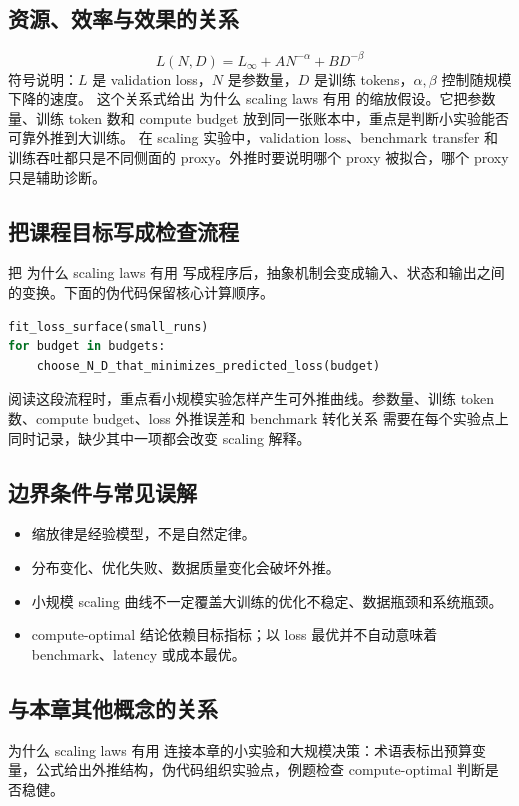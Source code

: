 \documentclass[a4paper]{article}
\begin{document}
\subsection{资源、效率与效果的关系}
\[L(N,D)=L_\infty + A N^{-\alpha}+B D^{-\beta}\]
符号说明：\(L\) 是 validation loss，\(N\) 是参数量，\(D\) 是训练 tokens，\(\alpha,\beta\) 控制随规模下降的速度。
这个关系式给出 为什么 scaling laws 有用 的缩放假设。它把参数量、训练 token 数和 compute budget 放到同一张账本中，重点是判断小实验能否可靠外推到大训练。
在 scaling 实验中，validation loss、benchmark transfer 和训练吞吐都只是不同侧面的 proxy。外推时要说明哪个 proxy 被拟合，哪个 proxy 只是辅助诊断。
\subsection{把课程目标写成检查流程}
把 为什么 scaling laws 有用 写成程序后，抽象机制会变成输入、状态和输出之间的变换。下面的伪代码保留核心计算顺序。
\begin{lstlisting}[language=Python]
fit_loss_surface(small_runs)
for budget in budgets:
    choose_N_D_that_minimizes_predicted_loss(budget)
\end{lstlisting}
阅读这段流程时，重点看小规模实验怎样产生可外推曲线。参数量、训练 token 数、compute budget、loss 外推误差和 benchmark 转化关系 需要在每个实验点上同时记录，缺少其中一项都会改变 scaling 解释。
\subsection{边界条件与常见误解}
\begin{itemize}
\item 缩放律是经验模型，不是自然定律。
\item 分布变化、优化失败、数据质量变化会破坏外推。
\item 小规模 scaling 曲线不一定覆盖大训练的优化不稳定、数据瓶颈和系统瓶颈。
\item compute-optimal 结论依赖目标指标；以 loss 最优并不自动意味着 benchmark、latency 或成本最优。
\end{itemize}
\subsection{与本章其他概念的关系}
为什么 scaling laws 有用 连接本章的小实验和大规模决策：术语表标出预算变量，公式给出外推结构，伪代码组织实验点，例题检查 compute-optimal 判断是否稳健。
\end{document}
